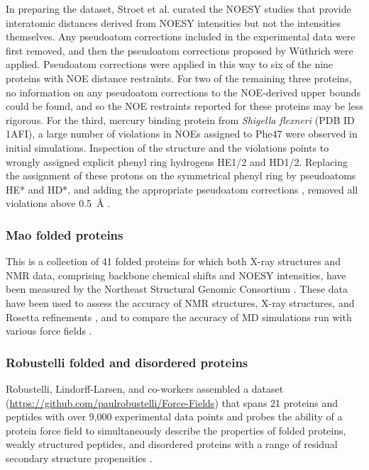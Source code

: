 \documentclass[9pt,review,pubversion]{livecoms}
\begin{document}
In preparing the dataset, Stroet et al. curated the NOESY studies that provide interatomic distances derived from NOESY intensities but not the intensities themselves.
Any pseudoatom corrections included in the experimental data were first removed, and then the pseudoatom corrections proposed by W\"{u}thrich \cite{wuthrich_nmr_1986} were applied.
Pseudoatom corrections were applied in this way to six of the nine proteins with NOE distance restraints.
For two of the remaining three proteins, no information on any pseudoatom corrections to the NOE-derived upper bounds could be found, and so the NOE restraints reported for these proteins may be less rigorous.
For the third, mercury binding protein from \textit{Shigella flexneri} (PDB ID 1AFI), a large number of violations in NOEs assigned to Phe47 were observed in initial simulations.
Inspection of the structure and the violations points to wrongly assigned explicit phenyl ring hydrogens HE1/2 and HD1/2.
Replacing the assignment of these protons on the symmetrical phenyl ring by pseudoatoms HE* and HD*, and adding the appropriate pseudoatom corrections \cite{wuthrich_nmr_1986}, removed all violations above \qty{0.5}{\angstrom} \cite{stroet_validation_2024}.

\subsubsection{Mao folded proteins}
\label{sub2:mao}

This is a collection of 41 folded proteins for which both X-ray structures and NMR data, comprising backbone chemical shifts and NOESY intensities, have been measured by the Northeast Structural Genomic Consortium \cite{mao_protein_2014}.
These data have been used to assess the accuracy of NMR structures, X-ray structures, and Rosetta refinements \cite{mao_protein_2014}, and to compare the accuracy of MD simulations run with various force fields \cite{robustelli_developing_2018,piana_development_2020}.

\subsubsection{Robustelli folded and disordered proteins}
\label{sub2:robustelli}

Robustelli, Lindorff-Larsen, and co-workers assembled a dataset (\url{https://github.com/paulrobustelli/Force-Fields}) that spans 21 proteins and peptides with over 9,000 experimental data points and probes the ability of a protein force field to simultaneously describe the properties of folded proteins, weakly structured peptides, and disordered proteins with a range of residual secondary structure propensities \cite{lindorff-larsen_improved_2010,lindorff2012systematic,piana_water_2015,robustelli_developing_2018,piana_development_2020}.
\end{document}
